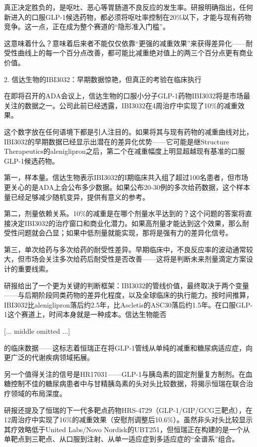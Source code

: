 \documentclass[11pt]{ctexart}
\begin{document}
真正决定胜负的，是呕吐、恶心等胃肠道不良反应的发生率。研报明确指出，任何新进入的口服GLP-1候选药物，都必须将呕吐率控制在20\%以下，才能与现有药物竞争。这一点，正在成为整个赛道的“隐形准入门槛”。

这意味着什么？意味着后来者不能仅仅依靠“更强的减重效果”来获得差异化——耐受性曲线上的每一个百分点改善，都可能比减重绝对值上的两三个百分点更有商业价值。

2. 信达生物的IBI3032：早期数据惊艳，但真正的考验在临床执行

在即将召开的ADA会议上，信达生物的口服小分子GLP-1药物IBI3032将是市场最关注的数据之一。公司此前已经透露，IBI3032在4周治疗中实现了10\%的减重效果。

这个数字放在任何语境下都是引人注目的。如果将其与现有药物的减重曲线对比，IBI3032的早期数据已经显示出潜在的差异化优势——它可能是继Structure Therapeutics的aleniglipron之后，第二个在减重幅度上明显超越现有基准的口服GLP-1候选药物。

第一，样本量。信达生物表示IBI3032的I期临床共入组了超过100名患者，但市场更关心的是ADA上会公布多少数据。如果公布20-30例的多次给药数据，这个样本量已经足够减少随机变异，提供有意义的参考。

第二，剂量依赖关系。10\%的减重是在哪个剂量水平达到的？这个问题的答案将直接决定IBI3032的治疗窗口和商业化潜力。如果高剂量才能达到这个效果，那么耐受性问题就会凸显；如果中低剂量就能实现，那将是强有力的差异化信号。

第三，单次给药与多次给药的耐受性差异。早期临床中，不良反应率的波动通常较大，但市场会关注多次给药后耐受性是否改善——这将是判断未来剂量滴定方案设计的重要线索。

研报给出了一个更为关键的判断框架：IBI3032的管线价值，最终取决于两个变量——与后期阶段同类药物的差异化程度，以及全球临床的执行能力。按时间推算，IBI3032比aleniglipron落后约2.5年，比Ascletis的ASC30落后约1.5年。在口服GLP-1这个赛道上，时间本身就是一种成本。信达生物能否

[... middle omitted ...]

的临床数据——这标志着恒瑞正在将GLP-1管线从单纯的减重和糖尿病适应症，向更广泛的代谢疾病领域拓展。

另一个值得关注的信号是HR17031——GLP-1与胰岛素的固定剂量复方制剂。在血糖控制不佳的糖尿病患者中与甘精胰岛素的头对头比较数据，将揭示恒瑞在联合治疗领域的布局深度。

研报还提及了恒瑞的下一代多靶点药物HRS-4729（GLP-1/GIP/GCG三靶点），在12周治疗中实现了16\%的减重效果（安慰剂调整后10.6\%）。虽然非头对头比较显示其疗效略低于United Labs/Novo Nordisk的UBT251，但恒瑞正在构建的是一个从单靶点到三靶点、从口服到注射、从单一适应症到多适应症的“全谱系”组合。
\end{document}
